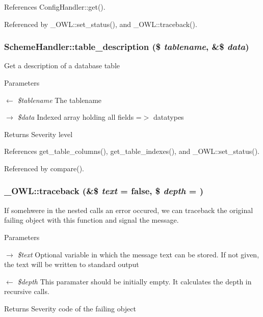 References ConfigHandler::get().



Referenced by \_\-OWL::set\_\-status(), and \_\-OWL::traceback().

\subsubsection[{table\_\-description}]{\setlength{\rightskip}{0pt plus 5cm}SchemeHandler::table\_\-description (\$ {\em tablename}, \/  \&\$ {\em data})}\label{classSchemeHandler_a236edc61301c6926449e68385cc59a99}
Get a description of a database table 
\begin{DoxyParams}{Parameters}
\item[\mbox{$\leftarrow$} {\em \$tablename}]The tablename \item[\mbox{$\rightarrow$} {\em \$data}]Indexed array holding all fields =$>$ datatypes \end{DoxyParams}
\begin{DoxyReturn}{Returns}
Severity level 
\end{DoxyReturn}


References get\_\-table\_\-columns(), get\_\-table\_\-indexes(), and \_\-OWL::set\_\-status().



Referenced by compare().

\subsubsection[{traceback}]{\setlength{\rightskip}{0pt plus 5cm}\_\-OWL::traceback (\&\$ {\em text} = {\ttfamily false}, \/  \$ {\em depth} = {})}\label{class__OWL_aa29547995d6741b7d2b90c1d4ea99a13}
If somehwere in the nested calls an error occured, we can traceback the original failing object with this function and signal the message.


\begin{DoxyParams}{Parameters}
\item[\mbox{$\rightarrow$} {\em \$text}]Optional variable in which the message text can be stored. If not given, the text will be written to standard output \item[\mbox{$\leftarrow$} {\em \$depth}]This paramater should be initially empty. It calculates the depth in recursive calls. \end{DoxyParams}
\begin{DoxyReturn}{Returns}
Severity code of the failing object 
\end{DoxyReturn}


